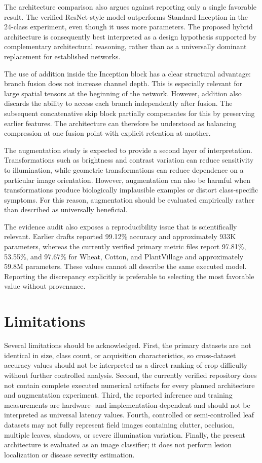 \documentclass[a4paper,fleqn]{cas-dc}
\begin{document}
The architecture comparison also argues against reporting only a single favorable result. The verified ResNet-style model outperforms Standard Inception in the 24-class experiment, even though it uses more parameters. The proposed hybrid architecture is consequently best interpreted as a design hypothesis supported by complementary architectural reasoning, rather than as a universally dominant replacement for established networks.

The use of addition inside the Inception block has a clear structural advantage: branch fusion does not increase channel depth. This is especially relevant for large spatial tensors at the beginning of the network. However, addition also discards the ability to access each branch independently after fusion. The subsequent concatenative skip block partially compensates for this by preserving earlier features. The architecture can therefore be understood as balancing compression at one fusion point with explicit retention at another.

The augmentation study is expected to provide a second layer of interpretation. Transformations such as brightness and contrast variation can reduce sensitivity to illumination, while geometric transformations can reduce dependence on a particular image orientation. However, augmentation can also be harmful when transformations produce biologically implausible examples or distort class-specific symptoms. For this reason, augmentation should be evaluated empirically rather than described as universally beneficial.

The evidence audit also exposes a reproducibility issue that is scientifically relevant. Earlier drafts reported 99.12\% accuracy and approximately 933K parameters, whereas the currently verified primary metric files report 97.81\%, 53.55\%, and 97.67\% for Wheat, Cotton, and PlantVillage and approximately 59.8M parameters. These values cannot all describe the same executed model. Reporting the discrepancy explicitly is preferable to selecting the most favorable value without provenance.

\section{Limitations}
Several limitations should be acknowledged. First, the primary datasets are not identical in size, class count, or acquisition characteristics, so cross-dataset accuracy values should not be interpreted as a direct ranking of crop difficulty without further controlled analysis. Second, the currently verified repository does not contain complete executed numerical artifacts for every planned architecture and augmentation experiment. Third, the reported inference and training measurements are hardware- and implementation-dependent and should not be interpreted as universal latency values. Fourth, controlled or semi-controlled leaf datasets may not fully represent field images containing clutter, occlusion, multiple leaves, shadows, or severe illumination variation. Finally, the present architecture is evaluated as an image classifier; it does not perform lesion localization or disease severity estimation.
\end{document}
